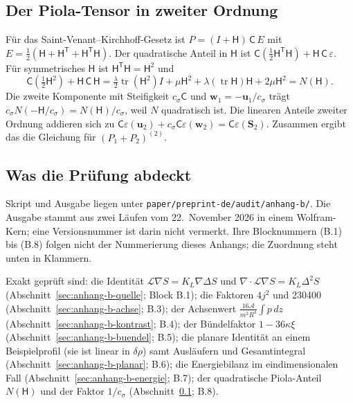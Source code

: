 \subsection{Der Piola-Tensor in zweiter Ordnung}
\label{sec:anhang-b-piola}

Für das Saint-Venant--Kirchhoff-Gesetz ist \(P=(I+\mathsf H)\,\mathsf C\,E\) mit \(E=\tfrac12(\mathsf H+\mathsf H^{\mathsf T}+\mathsf H^{\mathsf T}\mathsf H)\).
Der quadratische Anteil in \(\mathsf H\) ist \(\mathsf C(\tfrac12\mathsf H^{\mathsf T}\mathsf H)+\mathsf H\,\mathsf C\,\varepsilon\). Für symmetrisches
\(\mathsf H\) ist \(\mathsf H^{\mathsf T}\mathsf H=\mathsf H^2\) und
\[
 \mathsf C(\tfrac12\mathsf H^2)+\mathsf H\,\mathsf C\,\mathsf H
 =\tfrac\lambda2\operatorname{tr}(\mathsf H^2)I+\mu\mathsf H^2+\lambda(\operatorname{tr}\mathsf H)\mathsf H+2\mu\mathsf H^2=N(\mathsf H).
\]
Die zweite Komponente mit Steifigkeit \(c_\sigma\mathsf C\) und \(\mathbf w_1=-\mathbf u_1/c_\sigma\) trägt \(c_\sigma N(-\mathsf H/c_\sigma)=N(\mathsf H)/c_\sigma\),
weil \(N\) quadratisch ist. Die linearen Anteile zweiter Ordnung addieren sich zu \(\mathsf C\varepsilon(\mathbf u_2)+c_\sigma\mathsf C\varepsilon(\mathbf w_2)
=\mathsf C\varepsilon(\mathbf S_2)\). Zusammen ergibt das die Gleichung für \((P_1+P_2)^{(2)}\).

\subsection{Was die Prüfung abdeckt}
\label{sec:anhang-b-pruefung}

Skript und Ausgabe liegen unter \texttt{paper/\allowbreak preprint-de/\allowbreak audit/\allowbreak anhang-b/}. Die Ausgabe stammt aus zwei
Läufen vom 22.~November 2026 in einem Wolfram-Kern; eine Versionsnummer ist darin nicht vermerkt. Ihre Blocknummern (B.1) bis (B.8) folgen nicht
der Nummerierung dieses Anhangs; die Zuordnung steht unten in Klammern.

Exakt geprüft sind: die Identität \(\mathcal L\nabla S=K_L\nabla\Delta S\) und \(\nabla\cdot\mathcal L\nabla S=K_L\Delta^2S\) (Abschnitt~\ref{sec:anhang-b-quelle};
Block B.1); die Faktoren \(4j^2\) und 230400 (Abschnitt~\ref{sec:anhang-b-achse}; B.3); der Achsenwert \(\tfrac{16\mathcal A}{m^2R^4}\int p\,dz\)
(Abschnitt~\ref{sec:anhang-b-kontrast}; B.4); der Bündelfaktor \(1-36\kappa\xi\) (Abschnitt~\ref{sec:anhang-b-buendel}; B.5); die planare Identität an
einem Beispielprofil (sie ist linear in \(\delta\rho\)) samt Ausläufern und Gesamtintegral (Abschnitt~\ref{sec:anhang-b-planar}; B.6); die Energiebilanz
im eindimensionalen Fall (Abschnitt~\ref{sec:anhang-b-energie}; B.7); der quadratische Piola-Anteil \(N(\mathsf H)\) und der Faktor \(1/c_\sigma\)
(Abschnitt~\ref{sec:anhang-b-piola}; B.8).

